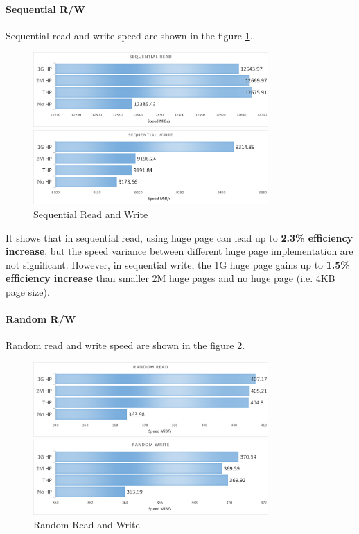 \documentclass[12pt]{article}
\begin{document}
\paragraph{Sequential R/W} Sequential read and write speed are shown in the figure \ref{fig:seq}.

\begin{figure}[h]
	\centering
	\includegraphics[width=0.8\textwidth]{fig3.png}

	\includegraphics[width=0.8\textwidth]{fig4.png}
	\caption{Sequential Read and Write}
	\label{fig:seq}
\end{figure}

It shows that in sequential read, using huge page can lead up to \textbf{2.3\% efficiency increase}, but the speed variance between different huge page implementation are not significant. However, in sequential write, the 1G huge page gains up to \textbf{1.5\% efficiency increase} than smaller 2M huge pages and no huge page (i.e. 4KB page size).

\paragraph{Random R/W} Random read and write speed are shown in the figure \ref{fig:rdm}.

\begin{figure}[h]
	\centering
	\includegraphics[width=0.8\textwidth]{fig5.png}

	\includegraphics[width=0.8\textwidth]{fig6.png}
	\caption{Random Read and Write}
	\label{fig:rdm}
\end{figure}
\end{document}
